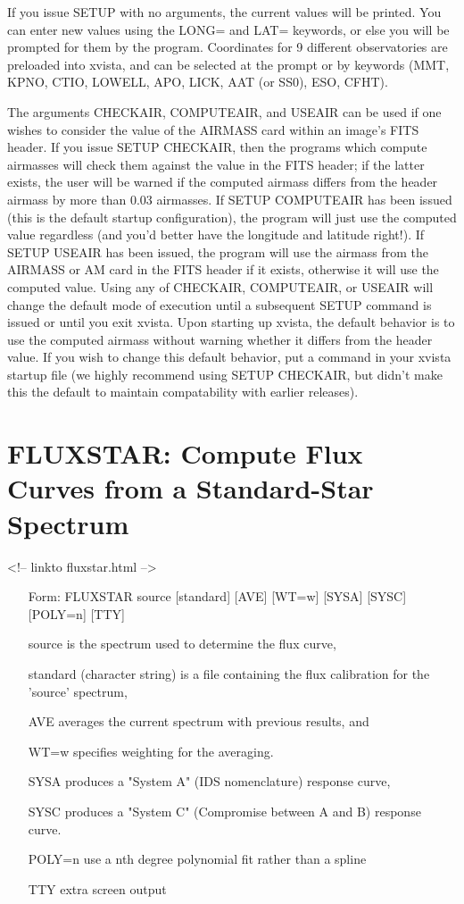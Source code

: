 If you issue SETUP with no arguments, the current values will be printed.
You can enter new values using the LONG= and LAT= keywords, or else you
will be prompted for them by the program. Coordinates for 9 different
observatories are preloaded into xvista, and can be selected at the
prompt or by keywords (MMT, KPNO, CTIO, LOWELL, APO, LICK, AAT (or SS0),
ESO, CFHT).

The arguments CHECKAIR, COMPUTEAIR, and USEAIR can be used if one wishes
to consider the value of the AIRMASS card within an image's FITS header.
If you issue SETUP CHECKAIR, then the programs which compute airmasses will
check them against the value in the FITS header; if the latter exists, the
user will be warned if the computed airmass differs from the header airmass
by more than 0.03 airmasses. If SETUP COMPUTEAIR has been issued (this is
the default startup configuration), the program will just use the computed
value regardless (and you'd better have the longitude and latitude right!).
If SETUP USEAIR has been issued, the program will use the airmass from the
AIRMASS or AM card in the FITS header if it exists, otherwise it will use
the computed value. Using any of CHECKAIR, COMPUTEAIR, or USEAIR will change
the default mode of execution until a subsequent SETUP command is issued or
until you exit xvista. Upon starting up xvista, the default behavior is
to use the computed airmass without warning whether it differs from the
header value. If you wish to change this default behavior, put a command
in your xvista startup file (we highly recommend using SETUP CHECKAIR, but
didn't make this the default to maintain compatability with earlier releases).

\section{FLUXSTAR: Compute Flux Curves from a Standard-Star Spectrum}
\begin{rawhtml}
<!-- linkto fluxstar.html -->
\end{rawhtml}
\begin{itemize}
  \item[Form: FLUXSTAR source {[standard]} {[AVE]} {[WT=w]} {[SYSA]} {[SYSC]}
       {[POLY=n]} {[TTY]}\hfill]{}
  \item[source]{is the spectrum used to determine the flux curve,}
  \item[standard]{(character string) is a file 
       containing the flux calibration for the 'source' spectrum,}
  \item[AVE]{averages the current spectrum with previous results, and}
  \item[WT=w]{specifies weighting for the averaging.}
  \item[SYSA]{produces a "System A" (IDS nomenclature) response curve,}
  \item[SYSC]{produces a "System C" (Compromise between A and B) response 
       curve.}
  \item[POLY=n]{use a nth degree polynomial fit rather than a spline}
  \item[TTY]{extra screen output}
\end{itemize}

